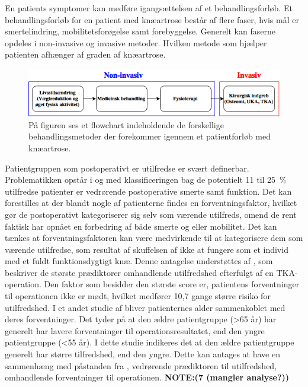 En patients symptomer kan medføre igangsættelsen af et behandlingsforløb. Et behandlingsforløb for en patient med knæartrose består af flere faser, hvis mål er smertelindring, mobilitetsforøgelse samt forebyggelse. Generelt kan faserne opdeles i non-invasive og invasive metoder. Hvilken metode som hjælper patienten afhænger af graden af knæartrose.

\begin{figure}[H]
	\centering
	\includegraphics[width=1\textwidth]{../figures/bProblemanalyse/flowchart_behandlingsforloeb.png}
	\caption{På figuren ses et flowchart indeholdende de forskellige behandlingsmetoder der forekommer igennem et patientforløb med knæartrose.}
	\label{fig:flow_behandlingsfaser}
\end{figure}\vspace{-.25cm}

Patientgruppen som postoperativt er utilfredse er svært definerbar. Problematikken opstår i og med klassificeringen bag de potentielt 11 til 25~\% utilfredse patienter er vedrørende postoperative smerte samt funktion. Det kan forestilles at der blandt nogle af patienterne findes en forventningsfaktor, hvilket gør de postoperativt kategoriserer sig selv som værende utilfreds, omend de rent faktisk har opnået en forbedring af både smerte og eller mobilitet. Det kan tænkes at forventningsfaktoren kan være medvirkende til at kategorisere dem som værende utilfredse, som resultat af skuffelsen af ikke at fungere som et individ med et fuldt funktionsdygtigt knæ. Denne antagelse understøttes af \cite{Bourne2010}, som beskriver de største prædiktorer omhandlende utilfredshed efterfulgt af en TKA-operation. Den faktor som besidder den største score er, patientens forventninger til operationen ikke er mødt, hvilket medfører 10,7 gange større risiko for utilfredshed. \citep{Bourne2010} I et andet studie af \cite{Keudell2013} bliver patienternes alder sammenkoblet med deres forventninger. Det tyder på at den ældre patientgruppe (>65 år) har generelt har lavere forventninger til operationsresultatet, end den yngre patientgruppe (<55 år). I dette studie indikeres det at den ældre patientgruppe generelt har større tilfredshed, end den yngre. Dette kan antages at have en sammenhæng med påstanden fra \cite{Bourne2010}, vedrørende prædiktoren til utilfredshed, omhandlende forventninger til operationen. \textbf{NOTE:(7 (mangler analyse?))}

